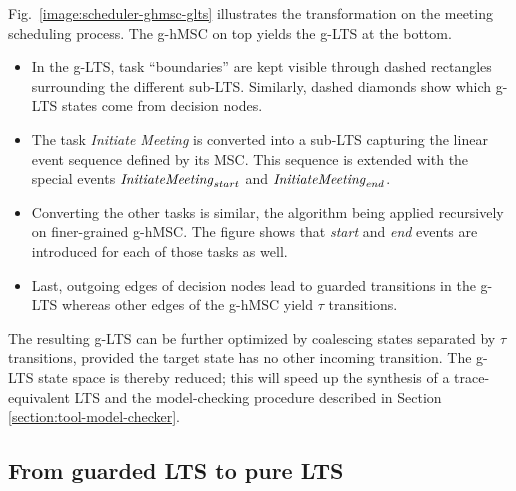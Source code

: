 Fig.~\ref{image:scheduler-ghmsc-glts} illustrates the transformation on the meeting scheduling process. The g-hMSC on top yields the g-LTS at the bottom.
\begin{itemize}
\item In the g-LTS, task ``boundaries'' are kept visible through dashed rectangles surrounding the different sub-LTS.  Similarly, dashed diamonds show which g-LTS states come from decision nodes. 
\item The task \emph{Initiate Meeting} is converted into a sub-LTS capturing the linear event sequence defined by its MSC. This sequence is extended with the special events $\mbox{\emph{InitiateMeeting}}_{start}$ and $\mbox{\emph{InitiateMeeting}}_{end}$.
\item Converting the other tasks is similar, the algorithm being applied recursively on finer-grained g-hMSC. The figure shows that \emph{start} and \emph{end} events are introduced for each of those tasks as well. 
\item Last, outgoing edges of decision nodes lead to guarded transitions in the g-LTS whereas other edges of the g-hMSC yield $\tau$ transitions.
\end{itemize}

The resulting g-LTS can be further optimized by coalescing states separated by $\tau$ transitions, provided the target state has no other incoming transition. The g-LTS state space is thereby reduced; this will speed up the synthesis of a trace-equivalent LTS and the model-checking procedure described in Section \ref{section:tool-model-checker}. 


\subsection{From guarded LTS to pure LTS\label{subsection:from-glts-to-lts}}


